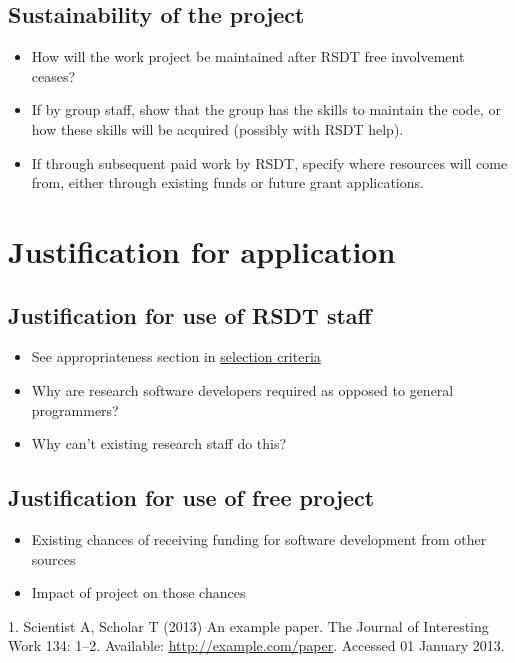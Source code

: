 \documentclass[]{scrartcl}
\begin{document}
\subsection{Sustainability of the
project}\label{sustainability-of-the-project}

\begin{itemize}
\itemsep1pt\parskip0pt
\item
  How will the work project be maintained after RSDT free involvement
  ceases?
\item
  If by group staff, show that the group has the skills to maintain the
  code, or how these skills will be acquired (possibly with RSDT help).
\item
  If through subsequent paid work by RSDT, specify where resources will
  come from, either through existing funds or future grant applications.
\end{itemize}

\section{Justification for
application}\label{justification-for-application}

\subsection{Justification for use of RSDT
staff}\label{justification-for-use-of-rsdt-staff}

\begin{itemize}
\itemsep1pt\parskip0pt
\item
  See appropriateness section in
  \href{http://development.rc.ucl.ac.uk/termly-call/selection.html}{selection
  criteria}
\item
  Why are research software developers required as opposed to general
  programmers?
\item
  Why can't existing research staff do this?
\end{itemize}

\subsection{Justification for use of free
project}\label{justification-for-use-of-free-project}

\begin{itemize}
\itemsep1pt\parskip0pt
\item
  Existing chances of receiving funding for software development from
  other sources
\item
  Impact of project on those chances
\end{itemize}

1. Scientist A, Scholar T (2013) An example paper. The Journal of
Interesting Work 134: 1--2. Available: \url{http://example.com/paper}.
Accessed 01 January 2013.
\end{document}
